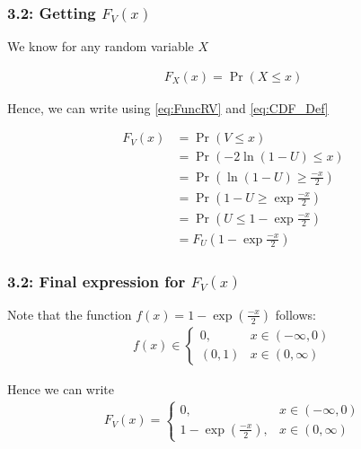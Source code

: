 \documentclass{beamer}
\begin{document}
\begin{frame}
	\frametitle{3.2: Getting $F_V(x)$}

	We know for any random variable $X$

	\begin{align}
		F_X(x) = \Pr(X \leq x)
		\label{eq:CDF_Def}
	\end{align}

	Hence, we can write using \eqref{eq:FuncRV} and \eqref{eq:CDF_Def}

	\begin{align}
		F_V(x) &= \Pr(V \leq x) \\
		&= \Pr(-2\ln{(1 - U)} \leq x)\\
		&= \Pr(\ln{(1 - U)} \geq \frac{-x}{2})\\
		&= \Pr(1 - U \geq \exp{\frac{-x}{2}})\\
		&= \Pr(U \leq 1 - \exp{\frac{-x}{2}})\\
		&= F_U(1 - \exp{\frac{-x}{2}})
		\label{eq: CDF_Rel}
	\end{align}

\end{frame}

\begin{frame}
	\frametitle{3.2: Final expression for $F_V(x)$}
	Note that the function $f(x) = 1 - \exp{\left(\frac{-x}{2}\right)}$ follows:
	\begin{align}
		f(x) \in
		\begin{cases}
			{0}, & x \in (-\infty, 0) \\
			(0, 1) & x \in (0, \infty)
		\end{cases}
	\end{align}

	Hence we can write
	\begin{align}
		F_V(x) = 
		\begin{cases}
			0, & x \in (-\infty, 0) \\
			1 - \exp{\left(\frac{-x}{2}\right)}, & x \in (0, \infty)
    		\end{cases}
	\end{align}
\end{frame}
\end{document}
